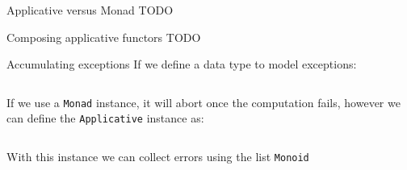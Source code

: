 \documentclass[10pt]{beamer}
\begin{document}
\begin{frame}{Applicative versus Monad}
  TODO
\end{frame}

\begin{frame}{Composing applicative functors}
  TODO
\end{frame}

\begin{frame}{Accumulating exceptions}
  If we define a data type to model exceptions:

  \inputminted{haskell}{../src/Except.hs}

  If we use a \verb~Monad~ instance, it will abort once the computation
  fails, however we can define the \verb~Applicative~ instance as:

  \inputminted{haskell}{../src/ExceptApplicative.hs}

  With this instance we can collect errors using the list
  \verb~Monoid~
\end{frame}



\end{document}
